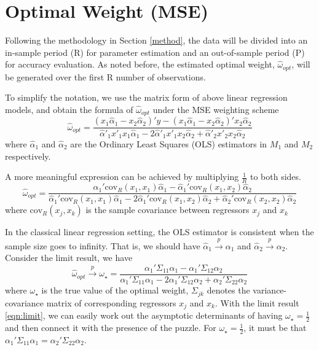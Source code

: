 \documentclass{monashthesis}
\begin{document}
\hypertarget{op}{%
\section{Optimal Weight (MSE)}\label{op}}

Following the methodology in Section \ref{method}, the data will be divided into an in-sample period (R) for parameter estimation and an out-of-sample period (P) for accuracy evaluation. As noted before, the estimated optimal weight, \(\hat\omega_{opt}\), will be generated over the first R number of observations.

To simplify the notation, we use the matrix form of above linear regression models, and obtain the formula of \(\hat\omega_{opt}\) under the MSE weighting scheme
\begin{equation*}
\label{eqn:opt}
\hat\omega_{opt} = \frac{(x_1 \hat\alpha_1 - x_2 \hat\alpha_2)' y - (x_1 \hat\alpha_1 - x_2 \hat\alpha_2)' x_2 \hat\alpha_2}{\hat\alpha'_1 x'_1 x_1 \hat\alpha_1 - 2\hat\alpha'_1 x'_1 x_2 \hat\alpha_2 + \hat\alpha'_2 x'_2 x_2 \hat\alpha_2}
\end{equation*}
where \(\hat\alpha_1\) and \(\hat\alpha_2\) are the Ordinary Least Squares (OLS) estimators in \(M_1\) and \(M_2\) respectively.

A more meaningful expression can be achieved by multiplying \(\frac{1}{R}\) to both sides.
\begin{equation}
\hat\omega_{opt} = \frac{\hat\alpha_1'\text{cov}_R(x_1,x_1)\hat\alpha_1 - \hat\alpha_1'\text{cov}_R(x_1,x_2)\hat\alpha_2}{\hat\alpha_1' \text{cov}_R(x_1,x_1)\hat\alpha_1 - 2\hat\alpha_1'\text{cov}_R(x_1,x_2)\hat\alpha_2 + \hat\alpha_2'\text{cov}_R(x_2,x_2)\hat\alpha_2}
\end{equation}
where \(\text{cov}_R(x_j,x_k)\) is the sample covariance between regressors \(x_j\) and \(x_k\)

In the classical linear regression setting, the OLS estimator is consistent when the sample size goes to infinity. That is, we should have \(\hat\alpha_1 \overset{p}{\to} \alpha_1\) and \(\hat\alpha_2 \overset{p}{\to} \alpha_2\). Consider the limit result, we have
\begin{equation}
\label{eqn:limit}
\hat\omega_{opt} \overset{p}{\to} \omega_\star = \frac{\alpha_1'\Sigma_{11}\alpha_1 - \alpha_1'\Sigma_{12}\alpha_2}{\alpha_1'\Sigma_{11}\alpha_1 - 2\alpha_1'\Sigma_{12}\alpha_2 + \alpha_2'\Sigma_{22}\alpha_2}
\end{equation}
where \(\omega_\star\) is the true value of the optimal weight, \(\Sigma_{jk}\) denotes the variance-covariance matrix of corresponding regressors \(x_j\) and \(x_k\). With the limit result \ref{eqn:limit}, we can easily work out the asymptotic determinants of having \(\omega_\star=\frac{1}{2}\) and then connect it with the presence of the puzzle. For \(\omega_\star=\frac{1}{2}\), it must be that \(\alpha_1'\Sigma_{11}\alpha_1 = \alpha_2'\Sigma_{22}\alpha_2\).
\end{document}
